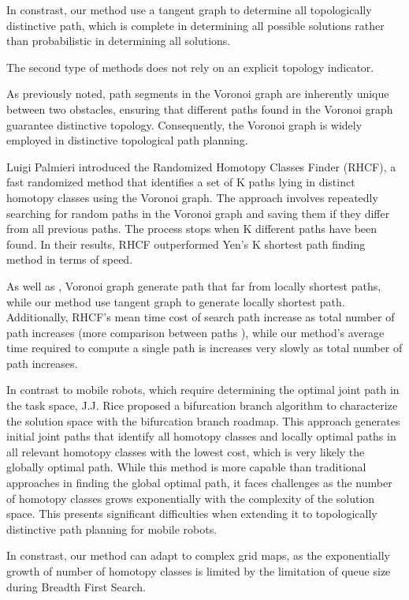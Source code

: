 \documentclass[lettersize,journal]{IEEEtran}
\begin{document}
In constrast, our method use a tangent graph to determine all topologically distinctive path, which is complete in determining all possible solutions rather than probabilistic in determining all solutions.


The second type of methods does not rely on an explicit topology indicator. 

As previously noted, path segments in the Voronoi graph are inherently unique between two obstacles, ensuring that different paths found in the Voronoi graph guarantee distinctive topology. Consequently, the Voronoi graph is widely employed in distinctive topological path planning.

Luigi Palmieri \cite{palmieri2015fast} introduced the Randomized Homotopy Classes Finder (RHCF), a fast randomized method that identifies a set of K paths lying in distinct homotopy classes using the Voronoi graph. The approach involves repeatedly searching for random paths in the Voronoi graph and saving them if they differ from all previous paths. The process stops when K different paths have been found. In their results, RHCF outperformed Yen's K shortest path finding method \cite{yen1971finding} in terms of speed.

As well as \cite{kuderer2014online}, Voronoi graph generate path that far from locally shortest paths, while our method use tangent graph to generate locally shortest path. Additionally, RHCF's mean time cost of search path increase as total number of path increases (more comparison between paths ), while our method's average time required to compute a single path is increases very slowly as total number of path increases.

In contrast to mobile robots, which require determining the optimal joint path in the task space, J.J. Rice \cite{rice2020multi} proposed a bifurcation branch algorithm to characterize the solution space with the bifurcation branch roadmap. This approach generates initial joint paths that identify all homotopy classes and locally optimal paths in all relevant homotopy classes with the lowest cost, which is very likely the globally optimal path. While this method is more capable than traditional approaches in finding the global optimal path, it faces challenges as the number of homotopy classes grows exponentially with the complexity of the solution space. This presents significant difficulties when extending it to topologically distinctive path planning for mobile robots.

In constrast, our method can adapt to complex grid maps, as the exponentially growth of number of homotopy classes is limited by the limitation of queue size during Breadth First Search. 
\end{document}
